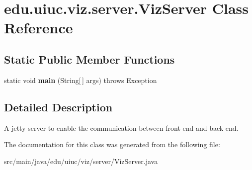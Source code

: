 \hypertarget{classedu_1_1uiuc_1_1viz_1_1server_1_1_viz_server}{}\section{edu.\+uiuc.\+viz.\+server.\+Viz\+Server Class Reference}
\label{classedu_1_1uiuc_1_1viz_1_1server_1_1_viz_server}
\subsection*{Static Public Member Functions}
\begin{DoxyCompactItemize}
\item 
\mbox{\label{classedu_1_1uiuc_1_1viz_1_1server_1_1_viz_server_ad272c1245e557004c045df072621086e}} 
static void {\bfseries main} (String\mbox{[}$\,$\mbox{]} args)  throws Exception 
\end{DoxyCompactItemize}


\subsection{Detailed Description}
A jetty server to enable the communication between front end and back end. 

The documentation for this class was generated from the following file\+:\begin{DoxyCompactItemize}
\item 
src/main/java/edu/uiuc/viz/server/Viz\+Server.\+java\end{DoxyCompactItemize}
